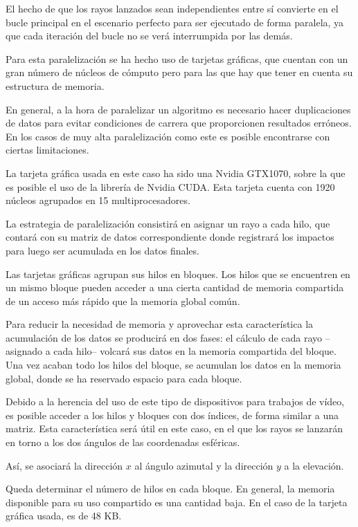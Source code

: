 El hecho de que los rayos lanzados sean independientes entre sí convierte en el bucle principal en el escenario perfecto para ser ejecutado de forma paralela, ya que cada iteración del bucle no se verá interrumpida por las demás.

Para esta paralelización se ha hecho uso de tarjetas gráficas, que cuentan con un gran número de núcleos de cómputo pero para las que hay que tener en cuenta su estructura de memoria.

En general, a la hora de paralelizar un algoritmo es necesario hacer duplicaciones de datos para evitar condiciones de carrera que proporcionen resultados erróneos.
En los casos de muy alta paralelización como este es posible encontrarse con ciertas limitaciones.

La tarjeta gráfica usada en este caso ha sido una Nvidia GTX1070, sobre la que es posible el uso de la librería de Nvidia CUDA.
Esta tarjeta cuenta con 1920 núcleos agrupados en 15 multiprocesadores.

La estrategia de paralelización consistirá en asignar un rayo a cada hilo, que contará con su matriz de datos correspondiente donde registrará los impactos para luego ser acumulada en los datos finales.

Las tarjetas gráficas agrupan sus hilos en bloques.
Los hilos que se encuentren en un mismo bloque pueden acceder a una cierta cantidad de memoria compartida de un acceso más rápido que la memoria global común.

Para reducir la necesidad de memoria y aprovechar esta característica la acumulación de los datos se producirá en dos fases: el cálculo de cada rayo --asignado a cada hilo-- volcará sus datos en la memoria compartida del bloque.
Una vez acaban todo los hilos del bloque, se acumulan los datos en la memoria global, donde se ha reservado espacio para cada bloque.

Debido a la herencia del uso de este tipo de dispositivos para trabajos de vídeo, es posible acceder a los hilos y bloques con dos índices, de forma similar a una matriz.
Esta característica será útil en este caso, en el que los rayos se lanzarán en torno a los dos ángulos de las coordenadas esféricas.

Así, se asociará la dirección $x$ al ángulo azimutal y la dirección $y$ a la elevación.

Queda determinar el número de hilos en cada bloque.
En general, la memoria disponible para su uso compartido es una cantidad baja.
En el caso de la tarjeta gráfica usada, es de 48 KB\cite{Nvidia}.

